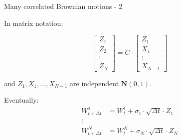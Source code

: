 \begin{frame}{Many correlated Brownian motions - 2}

In matrix notation:

\pause
\begin{displaymath}
	\begin{bmatrix}
			Z_1 \\
			Z_2 \\
			\vdots \\
			Z_N
		\end{bmatrix} 
		= C \cdot 
		\begin{bmatrix}
			Z_1 \\
			X_1 \\
			\vdots \\
			X_{N-1}
		\end{bmatrix} 
\end{displaymath}

\bigskip
and $Z_1, X_1, \ldots, X_{N-1}$ are independent $\textbf{N}(0,1)$.

\pause
\bigskip
Eventually:
\begin{align*}
		W^1_{t+\Delta t} & = W^1_t + \sigma_1 \cdot \sqrt{\Delta t} \cdot Z_1 \\
	\vdots & \\
	W^N_{t+\Delta t} & = W^N_t + \sigma_N \cdot \sqrt{\Delta t} \cdot Z_N \\
\end{align*}

\end{frame}